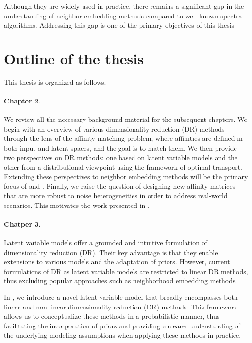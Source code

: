 Although they are widely used in practice, there remains a significant gap in the understanding of neighbor embedding methods compared to well-known spectral algorithms. Addressing this gap is one of the primary objectives of this thesis.


\section{Outline of the thesis}

This thesis is organized as follows.

\paragraph{Chapter 2.}
We review all the necessary background material for the subsequent chapters. We begin with an overview of various dimensionality reduction (DR) methods through the lens of the affinity matching problem, where affinities are defined in both input and latent spaces, and the goal is to match them. We then provide two perspectives on DR methods: one based on latent variable models and the other from a distributional viewpoint using the framework of optimal transport. Extending these perspectives to neighbor embedding methods will be the primary focus of  and . Finally, we raise the question of designing new affinity matrices that are more robust to noise heterogeneities in order to address real-world scenarios. This motivates the work presented in .

\paragraph{Chatper 3.} 
Latent variable models offer a grounded and intuitive formulation of dimensionality reduction (DR). Their key advantage is that they enable extensions to various models and the adaptation of priors. However, current formulations of DR as latent variable models are restricted to linear DR methods, thus excluding popular approaches such as neighborhood embedding methods. 

In , we introduce a novel latent variable model that broadly encompasses both linear and non-linear dimensionality reduction (DR) methods. This framework allows us to conceptualize these methods in a probabilistic manner, thus facilitating the incorporation of priors and providing a clearer understanding of the underlying modeling assumptions when applying these methods in practice.


